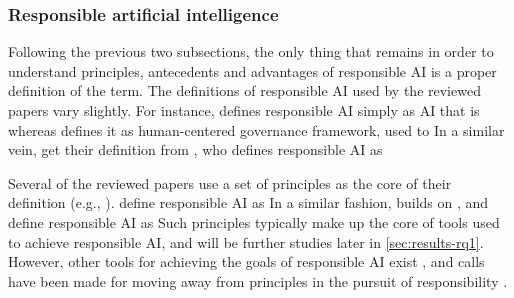 \subsubsection{Responsible artificial intelligence}
\label{sec:definition-responsibleAI}
Following the previous two subsections, the only thing that remains in order to understand principles, antecedents and advantages of responsible AI is a proper definition of the term. The definitions of responsible AI used by the reviewed papers vary slightly. For instance, \textcite[p. 6]{Doorn_2021} defines responsible AI simply as AI that is  whereas \textcite[p. 4964]{WangY_2020} defines it as human-centered governance framework, used to  In a similar vein, \textcite[p. 58-59]{Papagiannidis_2022} get their definition from \textcite{Singapore_framework}, who defines responsible AI as  %

Several of the reviewed papers use a set of principles as the core of their definition (e.g., \cite{WangW_2021,Cheng_2021}). \textcite[p. 83]{BarredoArrieta_2020} define responsible AI as  In a similar fashion, \textcite[p. 258]{Mikalef_2022} builds on \textcite{Accenture_AIservices}, and define responsible AI as  Such principles typically make up the core of tools used to achieve responsible AI, and will be further studies later in \autoref{sec:results-rq1}. However, other tools for achieving the goals of responsible AI exist \parencite{Werder_2022}, and calls have been made for moving away from principles in the pursuit of responsibility \parencite{Henriksen_2021}.

